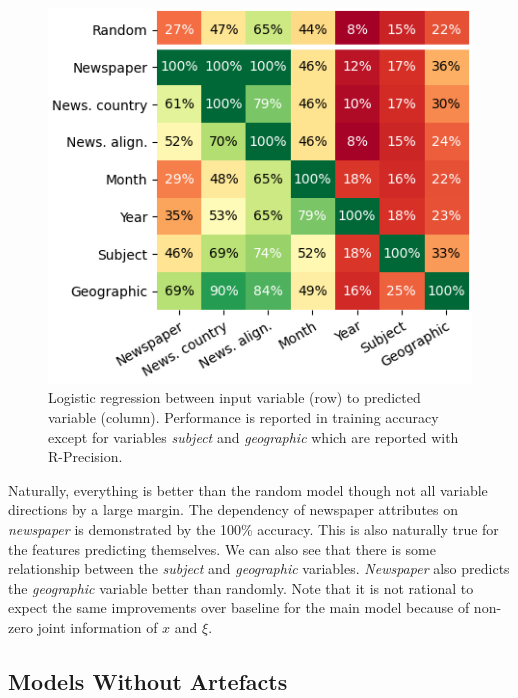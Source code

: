 \begin{figure}[ht]
\includegraphics[width=1\linewidth]{img/feature_dependency_lr.png}
\caption{Logistic regression between input variable (row) to predicted variable (column). Performance is reported in training accuracy except for variables \emph{subject} and \emph{geographic} which are reported with R-Precision.}
\label{fig:feature_dependency_lr}
\end{figure}

Naturally, everything is better than the random model though not all variable directions by a large margin.
The dependency of newspaper attributes on \emph{newspaper} is demonstrated by the 100\% accuracy.
This is also naturally true for the features predicting themselves.
We can also see that there is some relationship between the \emph{subject} and \emph{geographic} variables.
\emph{Newspaper} also predicts the \emph{geographic} variable better than randomly.
Note that it is not rational to expect the same improvements over baseline for the main model because of non-zero joint information of $x$ and $\xi$.

\subsection{Models Without Artefacts}


